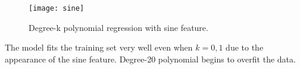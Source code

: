 \begin{answer}
	\begin{figure}[H]
		\centering
		\texttt{[image: sine]}
		\caption{Degree-k polynomial regression with sine feature.}
	\end{figure}
The model fits the training set very well even when $k = 0, 1$ due to the appearance of the sine feature. Degree-20 polynomial begins to overfit the data. \\
\end{answer}
